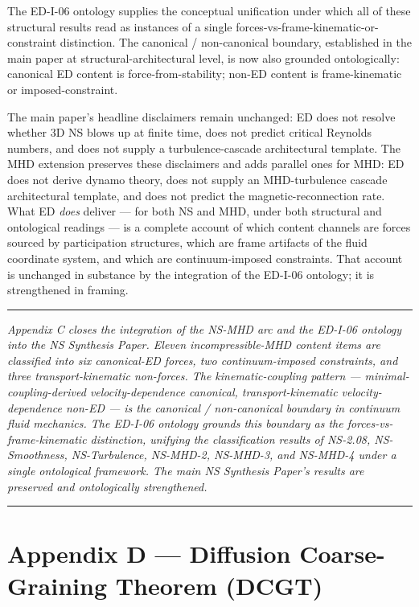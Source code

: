 \documentclass[
  11pt,a4paper]{article}
\begin{document}
The ED-I-06 ontology supplies the conceptual unification under which all
of these structural results read as instances of a single
forces-vs-frame-kinematic-or-constraint distinction. The canonical /
non-canonical boundary, established in the main paper at
structural-architectural level, is now also grounded ontologically:
canonical ED content is force-from-stability; non-ED content is
frame-kinematic or imposed-constraint.

The main paper's headline disclaimers remain unchanged: ED does not
resolve whether 3D NS blows up at finite time, does not predict critical
Reynolds numbers, and does not supply a turbulence-cascade architectural
template. The MHD extension preserves these disclaimers and adds
parallel ones for MHD: ED does not derive dynamo theory, does not supply
an MHD-turbulence cascade architectural template, and does not predict
the magnetic-reconnection rate. What ED \emph{does} deliver --- for both
NS and MHD, under both structural and ontological readings --- is a
complete account of which content channels are forces sourced by
participation structures, which are frame artifacts of the fluid
coordinate system, and which are continuum-imposed constraints. That
account is unchanged in substance by the integration of the ED-I-06
ontology; it is strengthened in framing.

\begin{center}\rule{0.5\linewidth}{0.5pt}\end{center}

\emph{Appendix C closes the integration of the NS-MHD arc and the
ED-I-06 ontology into the NS Synthesis Paper. Eleven incompressible-MHD
content items are classified into six canonical-ED forces, two
continuum-imposed constraints, and three transport-kinematic non-forces.
The kinematic-coupling pattern --- minimal-coupling-derived
velocity-dependence canonical, transport-kinematic velocity-dependence
non-ED --- is the canonical / non-canonical boundary in continuum fluid
mechanics. The ED-I-06 ontology grounds this boundary as the
forces-vs-frame-kinematic distinction, unifying the classification
results of NS-2.08, NS-Smoothness, NS-Turbulence, NS-MHD-2, NS-MHD-3,
and NS-MHD-4 under a single ontological framework. The main NS Synthesis
Paper's results are preserved and ontologically strengthened.}

\begin{center}\rule{0.5\linewidth}{0.5pt}\end{center}

\section{Appendix D --- Diffusion Coarse-Graining Theorem
(DCGT)}\label{appendix-d-diffusion-coarse-graining-theorem-dcgt}
\end{document}
